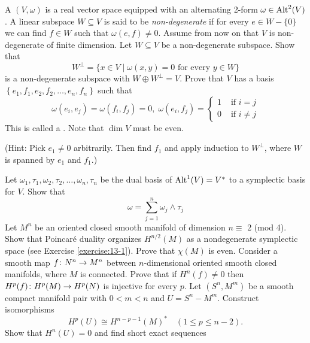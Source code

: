 \begin{enumerate}[label=\theexercise.\arabic*.,ref=\theexercise.\arabic*,leftmargin=2.7em]
\[    \]
  \newchap[13]
  \NewItem A  $( {V,\omega })$ is a real vector space equipped with an alternating 2-form $\omega  \in  {\operatorname{Alt}}^{2}( V)$. A linear subspace $W \subseteq  V$ is said to be \textit{non-degenerate} if for every $e \in  W- \{ 0\}$ we can find $f \in  W$ such that $\omega ( {e,f})  \neq  0$. Assume from now on that $V$ is non-degenerate of finite dimension.
    Let $W \subseteq  V$ be a non-degenerate subspace. Show that
    \[
      {W}^{ \bot  } = \{ x \in  V \mid  \omega ( {x,y})  = 0\text{ for every }y \in  W\}
    \]
    is a non-degenerate subspace with $W \oplus  {W}^{ \bot  } = V$. Prove that $V$ has a basis $\left\{  {{e}_{1},{f}_{1},{e}_{2},{f}_{2},\ldots,{e}_{n},{f}_{n}}\right\}$ such that
    \[
      \omega ( {{e}_{i},{e}_{j}})  = \omega ( {{f}_{i},{f}_{j}})  = 0,\;\omega ( {{e}_{i},{f}_{j}})  = 
      \begin{cases}
        1 & \text{ if } i = j \\  
        0 & \text{ if } i \neq  j 
      \end{cases}
    \]
    This is called a . Note that $\dim V$ must be even.
    \par(Hint: Pick ${e}_{1} \neq  0$ arbitrarily. Then find ${f}_{1}$ and apply induction to ${W}^{ \bot  }$, where $W$ is spanned by ${e}_{1}$ and ${f}_{1}$.)\par
    Let ${\omega }_{1},{\tau }_{1},{\omega }_{2},{\tau }_{2},\ldots,{\omega }_{n},{\tau }_{n}$ be the dual basis of ${\operatorname{Alt}}^{1}( V)  = {V}^*$ to a symplectic basis for $V$. Show that
    \[
      \omega  = \sum_{{j = 1}}^{n}{\omega }_{j} \land  {\tau }_{j}
    \]
  \NewItem Let ${M}^{n}$ be an oriented closed smooth manifold of dimension $n \equiv$ 2 (mod 4). Show that Poincar\'e duality organizes ${H}^{n/2}( M)$ as a nondegenerate symplectic space (see Exercise \ref{exercise:13-1}). Prove that $\chi ( M)$ is even.
  \NewItem Consider a smooth map $f\colon {N}^{n} \rightarrow  {M}^{n}$ between $n$-dimensional oriented smooth closed manifolds, where $M$ is connected. Prove that if ${H}^{n}( f)  \neq  0$ then ${H}^{p}( f)\colon {H}^{p}( M)  \rightarrow  {H}^{p}( N)$ is injective for every $p$.
  \NewItem Let $( {{S}^{n},{M}^{m}})$ be a smooth compact manifold pair with $0 < m < n$ and $U = {S}^{n}- {M}^{m}$. Construct isomorphisms
    \[
      {H}^{p}( U)  \cong  {H}^{n- p- 1}{( M) }^*\quad( {1 \leq  p \leq  n- 2}).
    \]
    Show that ${H}^{n}( U)  = 0$ and find short exact sequences
    \[
    \begin{aligned}

\end{aligned}\]
\end{enumerate}
